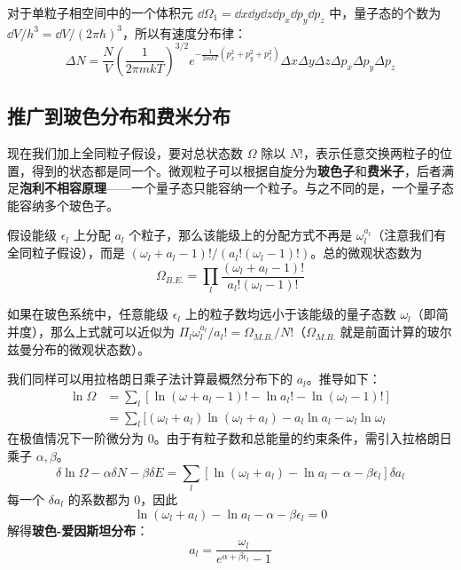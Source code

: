 对于单粒子相空间中的一个体积元 $\dd \Omega_1=\dd x\dd y\dd z\dd p_x\dd p_y\dd p_z$ 中，量子态的个数为 $\dd V/h^3=\dd V/(2\pi \hbar)^3$，所以有速度分布律：
\begin{equation}
\Delta N=\frac{N}{V}\left(\frac{1}{2\pi m k T}\right)^{3/2}e^{-\frac{1}{2mk T}(p_x^2+p_y^2+p_z^2)}\Delta x\Delta y\Delta z\Delta p_x\Delta p_y\Delta p_z
\end{equation}

\subsection{推广到玻色分布和费米分布}

现在我们加上全同粒子假设，要对总状态数 $\Omega$ 除以 $N!$，表示任意交换两粒子的位置，得到的状态都是同一个。微观粒子可以根据自旋分为\textbf{玻色子}和\textbf{费米子}，后者满足\textbf{泡利不相容原理}——一个量子态只能容纳一个粒子。与之不同的是，一个量子态能容纳多个玻色子。

假设能级 $\epsilon_l$ 上分配 $a_l$ 个粒子，那么该能级上的分配方式不再是 $\omega_l^{a_l}$（注意我们有全同粒子假设），而是 $(\omega_l+a_l-1)!/(a_l!(\omega_l-1)!)$。总的微观状态数为
\begin{equation}
\Omega_{B.E.}=\prod_l \frac{(\omega_l+a_l-1)!}{a_l!(\omega_l-1)!}
\end{equation}

如果在玻色系统中，任意能级 $\epsilon_l$ 上的粒子数均远小于该能级的量子态数 $\omega_l$（即简并度），那么上式就可以近似为 $\Pi_l \omega_l^{a_l}/a_l!=\Omega_{M.B.}/N!$（$\Omega_{M.B.}$ 就是前面计算的玻尔兹曼分布的微观状态数）。

我们同样可以用拉格朗日乘子法计算最概然分布下的 $a_l$。推导如下：
\begin{equation}
\begin{aligned}
\ln \Omega&=\sum_l[\ln (\omega+a_l-1)!-\ln a_l!-\ln (\omega_l-1)!]\\
&=\sum_l[(\omega_l+a_l)\ln(\omega_l+a_l)-a_l\ln a_l-\omega_l\ln \omega_l
\end{aligned}
\end{equation}
在极值情况下一阶微分为 $0$。由于有粒子数和总能量的约束条件，需引入拉格朗日乘子 $\alpha,\beta$。
\begin{equation}
\delta \ln \Omega-\alpha\delta N-\beta\delta E=\sum_l[\ln (\omega_l+a_l)-\ln a_l-\alpha-\beta\epsilon_l]\delta a_l
\end{equation}
每一个 $\delta a_l$ 的系数都为 $0$，因此
\begin{equation}
\ln(\omega_l+a_l)-\ln a_l-\alpha-\beta \epsilon_l=0
\end{equation}
解得\textbf{玻色-爱因斯坦分布}：
\begin{equation}
a_l=\frac{\omega_l}{e^{\alpha+\beta\epsilon_l}-1}
\end{equation}


